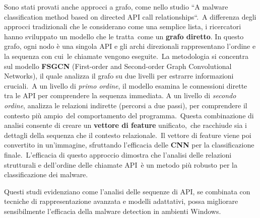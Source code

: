 Sono stati provati anche approcci a grafo, come nello studio ``A malware classification method based on directed API call relationships``.\
A differenza degli approcci tradizionali che le considerano come una semplice lista, i ricercatori hanno sviluppato un modello che le tratta\
come un \textbf{grafo diretto}. In questo grafo, ogni nodo è una singola API e gli archi direzionali rappresentano l'ordine e la sequenza con cui\
le chiamate vengono eseguite.\
La metodologia si concentra sul modello \textbf{FSGCN} (First-order and Second-order Graph Convolutional Networks),
il quale analizza il grafo su due livelli per estrarre informazioni cruciali.\
A un livello di \textit{primo ordine}, il modello esamina le connessioni dirette tra le API per comprendere la sequenza immediata.
A un livello di \textit{secondo ordine}, analizza le relazioni indirette (percorsi a due passi), per comprendere il contesto più ampio\
del comportamento del programma.\
Questa combinazione di analisi consente di creare un \textbf{vettore di feature} unificato,\
che racchiude sia i dettagli della sequenza che il contesto relazionale.\
Il vettore di feature viene poi convertito in un'immagine, sfruttando l'efficacia delle \textbf{CNN} per la classificazione finale.\
L'efficacia di questo approccio dimostra che l'analisi delle relazioni strutturali e dell'ordine delle chiamate API\
è un metodo più robusto per la classificazione dei malware.

Questi studi evidenziano come l'analisi delle sequenze di API, se combinata con tecniche di
rappresentazione avanzata e modelli adattativi, possa migliorare sensibilmente l'efficacia della
malware detection in ambienti Windows.